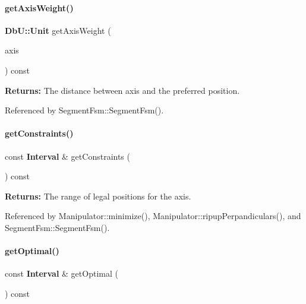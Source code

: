 \paragraph{\texorpdfstring{get\+Axis\+Weight()}{getAxisWeight()}}
{\footnotesize\ttfamily \textbf{ Db\+U\+::\+Unit} get\+Axis\+Weight (\begin{DoxyParamCaption}\item[{\textbf{ Db\+U\+::\+Unit}}]{axis }\end{DoxyParamCaption}) const\hspace{0.3cm}{\ttfamily [inline]}}

{\bfseries Returns\+:} The distance between {\ttfamily axis} and the preferred position. 

Referenced by Segment\+Fsm\+::\+Segment\+Fsm().

\mbox{\label{classKite_1_1RoutingEvent_a1bea8aed79a2ac4c726e49b93af3cd37}} 
\paragraph{\texorpdfstring{get\+Constraints()}{getConstraints()}}
{\footnotesize\ttfamily const \textbf{ Interval} \& get\+Constraints (\begin{DoxyParamCaption}{ }\end{DoxyParamCaption}) const\hspace{0.3cm}{\ttfamily [inline]}}

{\bfseries Returns\+:} The range of legal positions for the axis. 

Referenced by Manipulator\+::minimize(), Manipulator\+::ripup\+Perpandiculars(), and Segment\+Fsm\+::\+Segment\+Fsm().

\mbox{\label{classKite_1_1RoutingEvent_a7dc0bafe113b8ec0c143ae4644ac79d4}} 
\paragraph{\texorpdfstring{get\+Optimal()}{getOptimal()}}
{\footnotesize\ttfamily const \textbf{ Interval} \& get\+Optimal (\begin{DoxyParamCaption}{ }\end{DoxyParamCaption}) const\hspace{0.3cm}{\ttfamily [inline]}}

